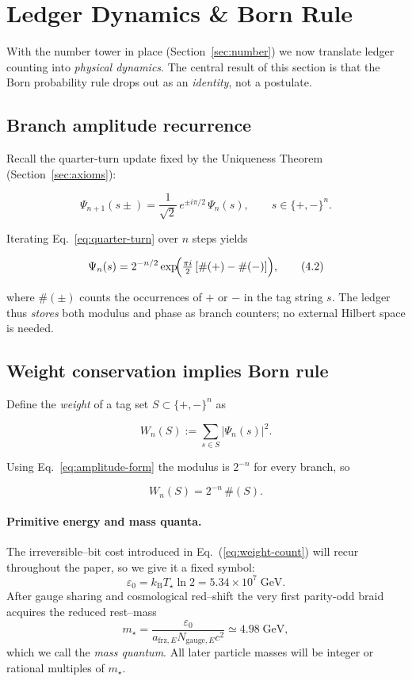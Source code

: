 \section{Ledger Dynamics \& Born Rule}
\label{sec:born}

With the number tower in place (Section~\ref{sec:number}) we now translate
ledger counting into \emph{physical dynamics}.  The central result of this
section is that the Born probability rule drops out as an \emph{identity},
not a postulate.

\subsection{Branch amplitude recurrence}

Recall the quarter-turn update fixed by the Uniqueness Theorem
(Section~\ref{sec:axioms}):

\[
  \Psi_{n+1}(s\pm)=\frac{1}{\sqrt2}\,
  e^{\pm i\pi/2}\,\Psi_n(s), \qquad
  s\in\{+,-\}^{n}.
\tag{4.1}\label{eq:quarter-turn}
\]

Iterating Eq.~\eqref{eq:quarter-turn} over $n$ steps yields

\[
  \Psi_n(s)=2^{-n/2}\exp\!\Bigl(
    \tfrac{\pi i}{2}\,[\#(+)-\#(-)]
  \Bigr),
\tag{4.2}\label{eq:amplitude-form}
\]

where $\#(\pm)$ counts the occurrences of $+$ or $-$ in the tag string
$s$.  The ledger thus \emph{stores} both modulus and phase as branch
counters; no external Hilbert space is needed.

\subsection{Weight conservation implies Born rule}

Define the \emph{weight} of a tag set $S\subset\{+,-\}^n$ as

\[
  W_n(S):=\sum_{s\in S} \lvert\Psi_n(s)\rvert^{2}.
\]

Using Eq.~\eqref{eq:amplitude-form} the modulus is $2^{-n}$ for every
branch, so

\[
  W_n(S)=2^{-n}\,\#(S).
\tag{4.3}\label{eq:weight-count}
\]

\paragraph{Primitive energy and mass quanta.}
The irreversible--bit cost introduced in Eq.~(\ref{eq:weight-count}) will recur throughout the
paper, so we give it a fixed symbol:
\[
  \boxed{\varepsilon_{0}=k_{\mathrm B}T_\star\ln 2
        =5.34\times10^{7}\;\mathrm{GeV}.}
\]
After gauge sharing and cosmological red--shift the very first
parity-odd braid acquires the reduced rest--mass
\[
  \boxed{m_\star=\frac{\varepsilon_{0}}{a_{\mathrm{frz},E}N_{\mathrm{gauge},E}c^{2}}
           \simeq 4.98\;\mathrm{GeV},}
\]
which we call the \emph{mass quantum}.  All later particle masses will be
integer or rational multiples of $m_\star$.

